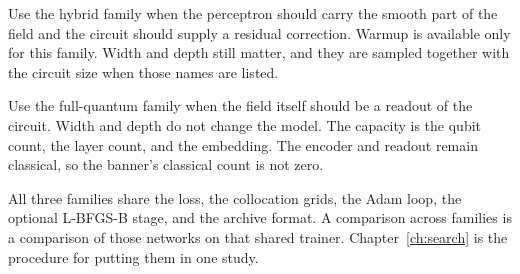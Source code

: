 Use the hybrid family when the perceptron should carry the smooth part of the field and the circuit should supply a residual correction.
Warmup is available only for this family.
Width and depth still matter, and they are sampled together with the circuit size when those names are listed.

Use the full-quantum family when the field itself should be a readout of the circuit.
Width and depth do not change the model.
The capacity is the qubit count, the layer count, and the embedding.
The encoder and readout remain classical, so the banner's classical count is not zero.

All three families share the loss, the collocation grids, the Adam loop, the optional L-BFGS-B stage, and the archive format.
A comparison across families is a comparison of those networks on that shared trainer.
Chapter~\ref{ch:search} is the procedure for putting them in one study.
